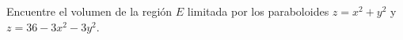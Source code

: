 \item Encuentre el volumen de la región $E$ limitada por los paraboloides $z = x^2 + y^2$ y $z = 36 - 3x^2 - 3y^2$.
